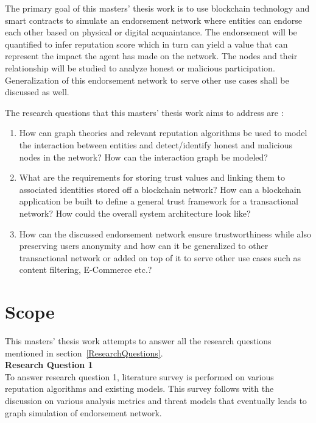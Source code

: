 The primary goal of this masters' thesis work is to use blockchain technology
and smart contracts to simulate an endorsement network where entities can
endorse each other based on physical or digital acquaintance. The endorsement
will be quantified to infer reputation score which in turn can yield a value
that can represent the impact the agent has made on the network.  The nodes and
their relationship will be studied to analyze honest or malicious
participation.  Generalization of this endorsement network to serve other use
cases shall be discussed as well. 

The research questions that this masters' thesis work aims to address are : 
\begin{enumerate}
		\item How can graph theories and relevant reputation algorithms be used
			to model the interaction between entities and detect/identify
			honest and malicious nodes in the network? How can the interaction
			graph be modeled? \label{question1}
		\item What are the requirements for storing trust values and linking
			them to associated identities stored off a blockchain network? How
			can a blockchain application be built to define a general trust
			framework for a transactional network? How could the overall system
			architecture look like? \label{question2} 
		\item How can the discussed endorsement network ensure trustworthiness
			while also preserving users anonymity and how can it be generalized
			to other transactional network or added on top of it to serve other
			use cases such as content filtering, E-Commerce
			etc.?\label{question3} 
\end{enumerate}

\section{Scope} 
This masters' thesis work attempts to answer all the research questions mentioned
in section~\ref{ResearchQuestions}. \\
\textbf{Research Question 1}\\
To answer research question 1, literature survey is performed on various
reputation algorithms and existing models. This survey follows with the
discussion on various analysis metrics and threat models that eventually leads to
graph simulation of endorsement network.  

